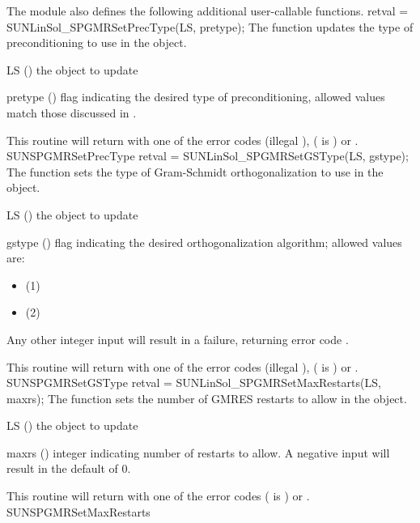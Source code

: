 The {\sunlinsolspgmr} module also defines the following additional
user-callable functions.
%
%
{
  retval = SUNLinSol\_SPGMRSetPrecType(LS, pretype);
}
{
  The function  updates the type of
  preconditioning to use in the {\sunlinsolspgmr} object.
}
{
  \begin{args}[pretype]
  \item[LS] ()
    the {\sunlinsolspgmr} object to update
  \item[pretype] ()
    flag indicating the desired type of preconditioning, allowed
    values match those discussed in .
  \end{args}
}
{
  This routine will return with one of the error codes
   (illegal ), 
  ( is ) or .
}
{}
{SUNSPGMRSetPrecType}
%
%
{
  retval = SUNLinSol\_SPGMRSetGSType(LS, gstype);
}
{
  The function  sets the type of
  Gram-Schmidt orthogonalization to use in the {\sunlinsolspgmr}
  object.
}
{
  \begin{args}[gstype]
  \item[LS] ()
    the {\sunlinsolspgmr} object to update
  \item[gstype] ()
    flag indicating the desired orthogonalization algorithm; allowed
    values are:
    \begin{itemize}
    \item {} (1)
    \item {} (2)
    \end{itemize}
    Any other integer input will result in a
    failure, returning error code \newline {}.
  \end{args}
}
{
  This routine will return with one of the error codes
   (illegal ), 
  ( is ) or .
}
{}
{SUNSPGMRSetGSType}
%
%
{
  retval = SUNLinSol\_SPGMRSetMaxRestarts(LS, maxrs);
}
{
  The function  sets the number of
  GMRES restarts to allow in the {\sunlinsolspgmr} object.
}
{
  \begin{args}[maxrs]
  \item[LS] ()
    the {\sunlinsolspgmr} object to update
  \item[maxrs] ()
    integer indicating number of restarts to allow.  A negative input
    will result in the default of 0.
  \end{args}
}
{
  This routine will return with one of the error codes
   ( is ) or .
}
{}
{SUNSPGMRSetMaxRestarts}


